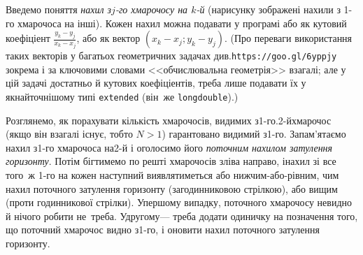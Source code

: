 \Tutorial	{}
Введемо поняття \emph{нахил з\nolinebreak[3] \mbox{$j$-го} хмарочосу на \mbox{$k$-й}} (на\nolinebreak[2] рисунку зображені нахили з \mbox{1-го} хмарочоса на інші). Кожен нахил можна подавати у програмі або як кутовий коефіціент 
$\displaystyle\frac{y_k-y_j}{x_k-x_j}$,
або як вектор $({x_k{-}x_j}; {y_k{-}y_j})$.
(Про переваги використання таких векторів у багатьох геометричних задачах
див.\nolinebreak[1] \verb"https://goo.gl/6yppjy" зокрема і за ключовими словами <<обчислювальна геометрія>> взагалі; але у цій задачі достатньо й кутових коефіціентів, треба лише подавати їх у якнайточнішому типі \verb"extended" (він~же \texttt{long\nolinebreak[3] double}).)

Розглянемо, як порахувати кількість хмарочосів, видимих з\nolinebreak[3] \mbox{1-го}.\linebreak[2] \mbox{2-й}\nolinebreak[3] хмарочос (якщо він взагалі існує, тобто ${N{>}1}$) гарантовано видимий з\nolinebreak[3] \mbox{1-го}. Запам’ятаємо нахил з\nolinebreak[3] \mbox{1-го} хмарочоса на\nolinebreak[3] \mbox{2-й} і оголосимо його \emph{поточним нахилом затулення горизонту}. Потім бігтимемо по решті хмарочосів зліва направо, і\nolinebreak[3] нахил зі все того~ж \mbox{1-го} на кожен наступний виявлятиметься або нижчим-або-рівним, чим нахил поточного затулення горизонту (за\nolinebreak[3] годинниковою стрілкою), або вищим (проти годинникової стрілки). У\nolinebreak[3] першому випадку, поточного хмарочосу не\nolinebreak[3] видно й нічого робити не~треба. У\nolinebreak[3] другому\nolinebreak[3] --- треба додати одиничку на позначення того, що поточний хмарочос видно з\nolinebreak[3] \mbox{1-го}, і оновити нахил поточного затулення горизонту.

